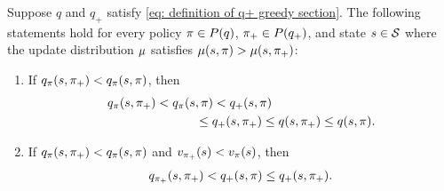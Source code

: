 \begin{lemma}
\label{thm: cannot exit sliding mode if not all states are better}

Suppose $q$ and $q_+$ satisfy \eqref{eq: definition of q+ greedy section}.
The following statements hold 
for every policy $\pi \in P(q)$, $\pi_+ \in P(q_+)$, and state $s \in \mathcal{S}$ where the update distribution $\mu$ satisfies $\mu(s, \pi) > \mu(s, \pi_+)$:
\begin{enumerate}
    \item If $q_{\pi}(s, \pi_+) < q_{\pi}(s, \pi)$, then
    \begin{align}
        \nonumber
        &q_{\pi}(s, \pi_+) 
        < q_{\pi}(s, \pi) 
        < q_+(s, \pi) 
        \\
        \label{eq: q approach from above}
        &\hspace{2.5cm} 
        \leq q_+(s, \pi_+)
        \leq q(s, \pi_+) \leq q(s, \pi) .
    \end{align}

    \item If $q_{\pi}(s, \pi_+) < q_{\pi}(s, \pi)$ and $v_{\pi_+}(s) < v_{\pi}(s)$, then 
    \begin{align}
    \label{eq: q+ approach from above}
        q_{\pi_+}(s, \pi_+) < q_+(s, \pi) \leq q_+(s, \pi_+) .
    \end{align}


\end{enumerate}
\end{lemma}
